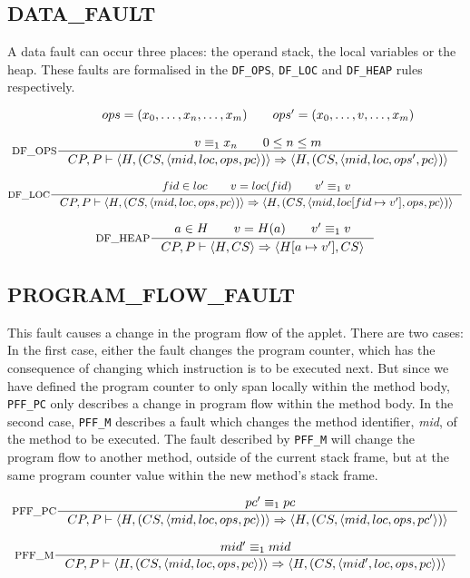 \subsection{DATA\_FAULT}
A data fault can occur three places: the operand stack, the local variables or the heap. These faults are formalised in the \texttt{DF\_OPS}, \texttt{DF\_LOC} and \texttt{DF\_HEAP} rules respectively.

$$\inference[DF\_OPS]{  
ops = (x_0,  \ldots, x_n, \ldots, x_m) \semsp
ops' = (x_0, \ldots, v, \ldots, x_m) \semnl \\
v \equiv_1 x_n \semsp
0 \leq n \leq m 
}
{CP, P \vdash \langle H, (CS, \langle  mid, loc, ops, pc \rangle)\rangle \Rightarrow \langle H, (CS, \langle mid, loc, ops', pc \rangle)\rangle}$$

$$\inference[DF\_LOC]{  
fid \in loc \semsp
 v = loc(fid) \semsp
  v' \equiv_1 v
}
{CP, P \vdash \langle H, (CS, \langle  mid, loc, ops, pc \rangle)\rangle  \Rightarrow \langle H, (CS, \langle mid, loc[fid \mapsto v'], ops, pc \rangle)\rangle }$$


$$\inference[DF\_HEAP]{  
a \in H \semsp
 v = H(a) \semsp
 v' \equiv_1 v
}
{CP, P \vdash \langle H, CS\rangle  \Rightarrow \langle H[a \mapsto v'], CS\rangle }$$


\subsection{PROGRAM\_FLOW\_FAULT} \label{sec:pff}
This fault causes a change in the program flow of the applet. There are two cases: In the first case, either the fault changes the program counter, which has the consequence of changing which instruction is to be executed next. But since we have defined the program counter to only span locally within the method body, \texttt{PFF\_PC} only describes a change in program flow within the method body. In the second case, \texttt{PFF\_M} describes a fault which changes the method identifier, \textit{mid}, of the method to be executed. The fault described by \texttt{PFF\_M} will change the program flow to another method, outside of the current stack frame, but at the same program counter value within the new method's stack frame.

$$\inference[PFF\_PC]{  
 \semsp pc' \equiv_1 pc
}
{CP, P \vdash \langle H, (CS, \langle  mid, loc, ops, pc \rangle)\rangle  \Rightarrow \langle H, (CS, \langle mid, loc, ops, pc' \rangle)\rangle}$$

$$\inference[PFF\_M]{  
mid' \equiv_1 mid
}
{CP, P \vdash \langle H, (CS, \langle  mid, loc, ops, pc \rangle)\rangle  \Rightarrow \langle H, (CS, \langle mid', loc, ops, pc \rangle)\rangle }$$

